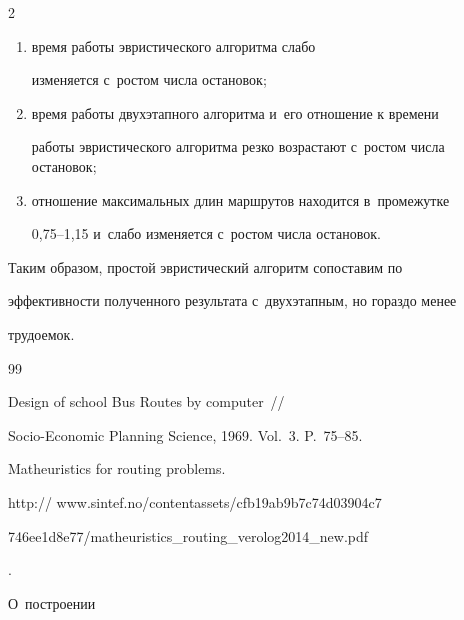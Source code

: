 \begin{multicols}{2}
\begin{enumerate}[(1)]

\item время работы эвристического алгоритма слабо

изменяется с~ростом числа остановок;

\item время работы двухэтапного алгоритма и~его отношение к времени

работы эвристического алгоритма резко возрастают с~ростом числа остановок;

\item отношение максимальных длин маршрутов находится в~промежутке

0,75--1,15 и~слабо изменяется с~ростом числа остановок.

\end{enumerate}



Таким образом, простой эвристический алгоритм сопоставим по

эффективности полученного результата с~двухэтапным, но гораздо менее

трудоемок.



\vspace*{-9pt}



{\small\frenchspacing

 {%


 \begin{thebibliography}{99}


 Design of school Bus Routes by computer~//

Socio-Economic Planning Science, 1969. Vol.~3. P.~75--85.


 Matheuristics for routing problems. {\sf

http:// www.sintef.no/contentassets/cfb19ab9b7c74d03904c7\linebreak

746ee1d8e77/matheuristics\_routing\_verolog2014\_new.\linebreak pdf}.


 О~построении


\end{thebibliography}}}
\end{multicols}
